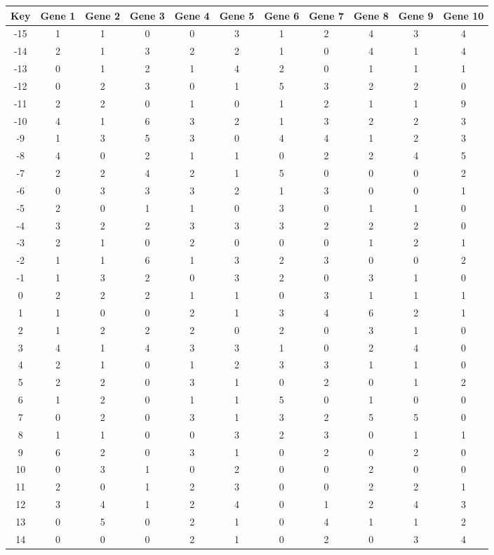 \begin{tabular}{|c|c|c|c|c|c|c|c|c|c|c|}
\hline
Key & Gene 1 & Gene 2 & Gene 3 & Gene 4 & Gene 5 & Gene 6 & Gene 7 & Gene 8 & Gene 9 & Gene 10 \\
\hline
-15 & 1 & 1 & 0 & 0 & 3 & 1 & 2 & 4 & 3 & 4 \\
-14 & 2 & 1 & 3 & 2 & 2 & 1 & 0 & 4 & 1 & 4 \\
-13 & 0 & 1 & 2 & 1 & 4 & 2 & 0 & 1 & 1 & 1 \\
-12 & 0 & 2 & 3 & 0 & 1 & 5 & 3 & 2 & 2 & 0 \\
-11 & 2 & 2 & 0 & 1 & 0 & 1 & 2 & 1 & 1 & 9 \\
-10 & 4 & 1 & 6 & 3 & 2 & 1 & 3 & 2 & 2 & 3 \\
-9 & 1 & 3 & 5 & 3 & 0 & 4 & 4 & 1 & 2 & 3 \\
-8 & 4 & 0 & 2 & 1 & 1 & 0 & 2 & 2 & 4 & 5 \\
-7 & 2 & 2 & 4 & 2 & 1 & 5 & 0 & 0 & 0 & 2 \\
-6 & 0 & 3 & 3 & 3 & 2 & 1 & 3 & 0 & 0 & 1 \\
-5 & 2 & 0 & 1 & 1 & 0 & 3 & 0 & 1 & 1 & 0 \\
-4 & 3 & 2 & 2 & 3 & 3 & 3 & 2 & 2 & 2 & 0 \\
-3 & 2 & 1 & 0 & 2 & 0 & 0 & 0 & 1 & 2 & 1 \\
-2 & 1 & 1 & 6 & 1 & 3 & 2 & 3 & 0 & 0 & 2 \\
-1 & 1 & 3 & 2 & 0 & 3 & 2 & 0 & 3 & 1 & 0 \\
0 & 2 & 2 & 2 & 1 & 1 & 0 & 3 & 1 & 1 & 1 \\
1 & 1 & 0 & 0 & 2 & 1 & 3 & 4 & 6 & 2 & 1 \\
2 & 1 & 2 & 2 & 2 & 0 & 2 & 0 & 3 & 1 & 0 \\
3 & 4 & 1 & 4 & 3 & 3 & 1 & 0 & 2 & 4 & 0 \\
4 & 2 & 1 & 0 & 1 & 2 & 3 & 3 & 1 & 1 & 0 \\
5 & 2 & 2 & 0 & 3 & 1 & 0 & 2 & 0 & 1 & 2 \\
6 & 1 & 2 & 0 & 1 & 1 & 5 & 0 & 1 & 0 & 0 \\
7 & 0 & 2 & 0 & 3 & 1 & 3 & 2 & 5 & 5 & 0 \\
8 & 1 & 1 & 0 & 0 & 3 & 2 & 3 & 0 & 1 & 1 \\
9 & 6 & 2 & 0 & 3 & 1 & 0 & 2 & 0 & 2 & 0 \\
10 & 0 & 3 & 1 & 0 & 2 & 0 & 0 & 2 & 0 & 0 \\
11 & 2 & 0 & 1 & 2 & 3 & 0 & 0 & 2 & 2 & 1 \\
12 & 3 & 4 & 1 & 2 & 4 & 0 & 1 & 2 & 4 & 3 \\
13 & 0 & 5 & 0 & 2 & 1 & 0 & 4 & 1 & 1 & 2 \\
14 & 0 & 0 & 0 & 2 & 1 & 0 & 2 & 0 & 3 & 4 \\
\hline
\end{tabular}